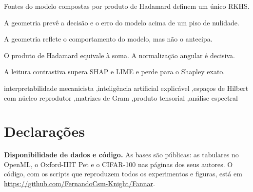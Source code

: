 \documentclass[a4paper,fleqn]{cas-sc}
\theoremstyle{plain}
\theoremstyle{definition}
\theoremstyle{remark}
\begin{document}
\begin{highlights}
\item Fontes do modelo compostas por produto de Hadamard definem um único RKHS.
\item A geometria prevê a decisão e o erro do modelo acima de um piso de nulidade.
\item A geometria reflete o comportamento do modelo, mas não o antecipa.
\item O produto de Hadamard equivale à soma. A normalização angular é decisiva.
\item A leitura contrastiva supera SHAP e LIME e perde para o Shapley exato.
\end{highlights}

\begin{keywords}
interpretabilidade mecanicista \sep inteligência artificial explicável \sep espaços de Hilbert com núcleo reprodutor \sep matrizes de Gram \sep produto tensorial \sep análise espectral
\end{keywords}

\maketitle













\section*{Declarações}

\textbf{Disponibilidade de dados e código.} As bases são públicas: as tabulares no OpenML, o Oxford-IIIT Pet e o CIFAR-100 nas páginas dos seus autores. O código, com os scripts que reproduzem todos os experimentos e figuras, está em \url{https://github.com/FernandoCsm-Knight/Fannar}.



\end{document}
